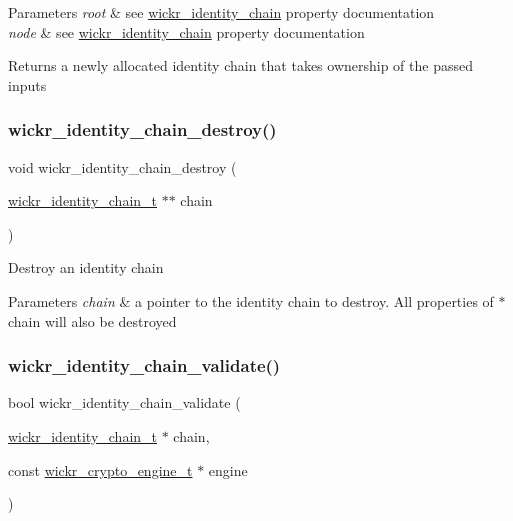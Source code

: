 \begin{DoxyParams}{Parameters}
{\em root} & see \textquotesingle{}\mbox{\hyperlink{structwickr__identity__chain}{wickr\+\_\+identity\+\_\+chain}}\textquotesingle{} property documentation \\
\hline
{\em node} & see \textquotesingle{}\mbox{\hyperlink{structwickr__identity__chain}{wickr\+\_\+identity\+\_\+chain}}\textquotesingle{} property documentation \\
\hline
\end{DoxyParams}
\begin{DoxyReturn}{Returns}
a newly allocated identity chain that takes ownership of the passed inputs 
\end{DoxyReturn}
\mbox{\label{group__wickr__identity_gadbddf6d49fddb2df103486970b3d564b}} 
\subsubsection{\texorpdfstring{wickr\_identity\_chain\_destroy()}{wickr\_identity\_chain\_destroy()}}
{\footnotesize\ttfamily void wickr\+\_\+identity\+\_\+chain\+\_\+destroy (\begin{DoxyParamCaption}\item[{\mbox{\hyperlink{structwickr__identity__chain}{wickr\+\_\+identity\+\_\+chain\+\_\+t}} $\ast$$\ast$}]{chain }\end{DoxyParamCaption})}

Destroy an identity chain


\begin{DoxyParams}{Parameters}
{\em chain} & a pointer to the identity chain to destroy. All properties of \textquotesingle{}$\ast$chain\textquotesingle{} will also be destroyed \\
\hline
\end{DoxyParams}
\mbox{\label{group__wickr__identity_ga3a4b103f6b03f82149a90f1b81c63456}} 
\subsubsection{\texorpdfstring{wickr\_identity\_chain\_validate()}{wickr\_identity\_chain\_validate()}}
{\footnotesize\ttfamily bool wickr\+\_\+identity\+\_\+chain\+\_\+validate (\begin{DoxyParamCaption}\item[{\mbox{\hyperlink{structwickr__identity__chain}{wickr\+\_\+identity\+\_\+chain\+\_\+t}} $\ast$}]{chain,  }\item[{const \mbox{\hyperlink{structwickr__crypto__engine}{wickr\+\_\+crypto\+\_\+engine\+\_\+t}} $\ast$}]{engine }\end{DoxyParamCaption})}

